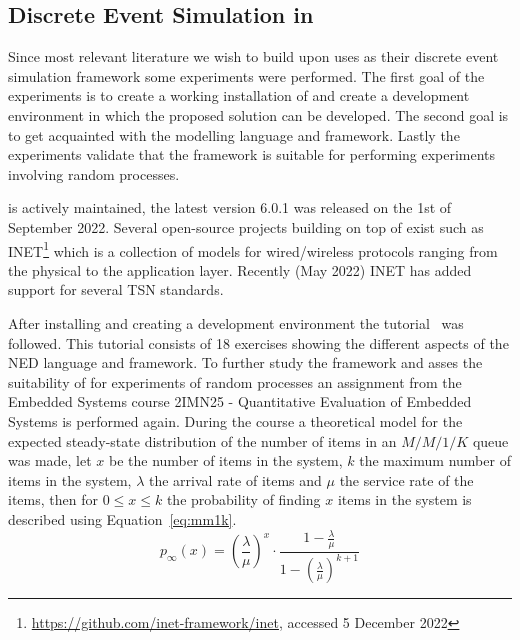\subsection{Discrete Event Simulation in \omnet}
\label{sec:omnetpp}
Since most relevant literature we wish to build upon uses \omnet as their discrete event simulation framework some experiments were performed. The first goal of the experiments is to create a working installation of \omnet and create a development environment in which the proposed solution can be developed. The second goal is to get acquainted with the modelling language and framework. Lastly the experiments validate that the framework is suitable for performing experiments involving random processes.

\omnet is actively maintained, the latest version 6.0.1 was released on the 1st of September 2022. Several open-source projects building on top of \omnet exist such as INET\footnote{\url{https://github.com/inet-framework/inet}, accessed 5 December 2022} which is a collection of models for wired/wireless protocols ranging from the physical to the application layer. Recently (May 2022) INET has added support for several TSN standards.

After installing \omnet and creating a development environment the \omnet tutorial~\cite{omnettutorial} was followed. This tutorial consists of 18 exercises showing the different aspects of the NED language and framework. To further study the framework and asses the suitability of \omnet for experiments of random processes an assignment from the Embedded Systems course 2IMN25 - Quantitative Evaluation of Embedded Systems is performed again. During the course a theoretical model for the expected steady-state distribution of the number of items in an $M/M/1/K$ queue was made, let $x$ be the number of items in the system, $k$ the maximum number of items in the system, $\lambda$ the arrival rate of items and $\mu$ the service rate of the items, then for $0 \leq x\leq k$ the probability of finding $x$ items in the system is described using Equation~\ref{eq:mm1k}. 
\begin{equation}
    \label{eq:mm1k}
p_\infty (x) = \left(\frac{\lambda}{\mu}\right)^x\cdot\frac{1-\frac{\lambda}{\mu}}{1-\left(\frac{\lambda}{\mu}\right)^{k+1}}
\end{equation}

